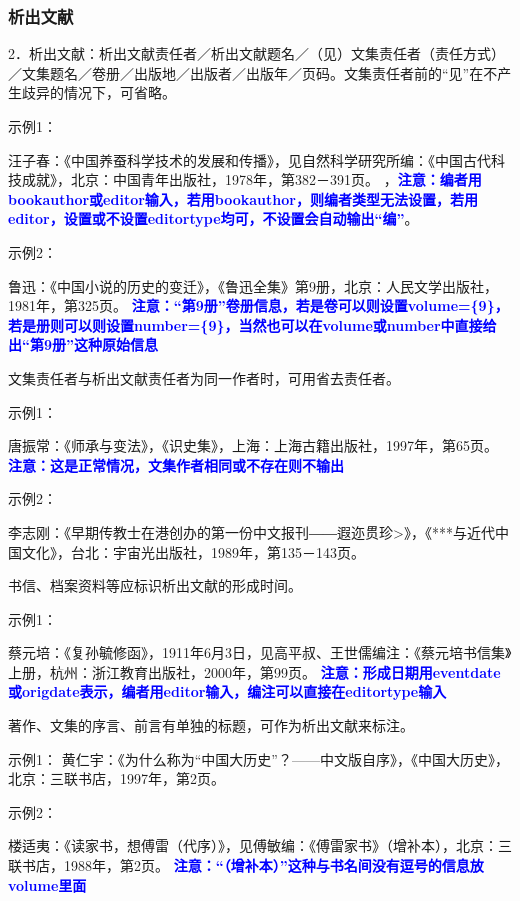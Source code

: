 \documentclass{article}
\newcommand{\qd}[1]{\textbf{\textcolor{blue}{#1}}}
\begin{document}
\subsubsection{析出文献}
2．析出文献：析出文献责任者／析出文献题名／（见）文集责任者（责任方式）／文集题名／卷册／出版地／出版者／出版年／页码。文集责任者前的“见”在不产
生歧异的情况下，可省略。

示例1：

汪子春：《中国养蚕科学技术的发展和传播》，见自然科学研究所编：《中国古代科技成就》，北京：中国青年出版社，1978年，第382－391页。
，\qd{注意：编者用bookauthor或editor输入，若用bookauthor，则编者类型无法设置，若用editor，设置或不设置editortype均可，不设置会自动输出“编”}。

示例2：

鲁迅：《中国小说的历史的变迁》，《鲁迅全集》第9册，北京：人民文学出版社，1981年，第325页。
 \qd{注意：“第9册”卷册信息，若是卷可以则设置volume=\{9\}，若是册则可以则设置number=\{9\}，当然也可以在volume或number中直接给出“第9册”这种原始信息}

文集责任者与析出文献责任者为同一作者时，可用省去责任者。

示例1：

唐振常：《师承与变法》，《识史集》，上海：上海古籍出版社，1997年，第65页。
\qd{注意：这是正常情况，文集作者相同或不存在则不输出}

示例2：

李志刚：《早期传教士在港创办的第一份中文报刊――遐迩贯珍>》，《***与近代中国文化》，台北：宇宙光出版社，1989年，第135－143页。

书信、档案资料等应标识析出文献的形成时间。

示例1：

蔡元培：《复孙毓修函》，1911年6月3日，见高平叔、王世儒编注：《蔡元培书信集》上册，杭州：浙江教育出版社，2000年，第99页。
 \qd{注意：形成日期用eventdate或origdate表示，编者用editor输入，编注可以直接在editortype输入}

著作、文集的序言、前言有单独的标题，可作为析出文献来标注。

示例1：
黄仁宇：《为什么称为“中国大历史”？——中文版自序》，《中国大历史》，北京：三联书店，1997年，第2页。

示例2：

楼适夷：《读家书，想傅雷（代序）》，见傅敏编：《傅雷家书》（增补本），北京：三联书店，1988年，第2页。
  \qd{注意：“（增补本）”这种与书名间没有逗号的信息放volume里面}
\end{document}
